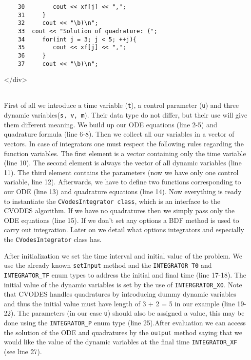 \documentclass[a4paper,12pt]{book}
\newcommand{\codeend}{
\begin{rawhtml}
</div>
\end{rawhtml}
}
\begin{document}
{\begin{verbatim}
    30        cout << xf[j] << ",";
    31     }
    32     cout << "\b)\n";
    33  cout << "Solution of quadrature: (";
    34     for(int j = 3; j < 5; ++j){
    35        cout << xf[j] << ",";
    36     }
    37     cout << "\b)\n";
\end{verbatim}
\codeend\\
First of all we introduce a time variable (\texttt{t}), a control parameter (\texttt{u}) and three dynamic variables(\texttt{s, v, m}).
Their data type do not differ, but their use will give them different meaning. We build up our ODE equations (line 2-5) and quadrature formula
(line 6-8). Then we collect all our variables in a vector of vectors. In case of integrators one must respect the following rules regarding the
function variables. The first element
is a vector containing only the time variable (line 10). The second element is always the vector of all dynamic variables (line 11).
The third element contains the parameters (now we have only one control variable, line 12). Afterwards, we have to define two functions corresponding
to our ODE (line 13) and quadrature equations (line 14). Now everything is ready to instantiate the \texttt{CVodesIntegrator class}, which is an interface
to the CVODES algorithm. If we have no quadratures then we simply pass only the ODE equations (line 15). If we don't set any options a BDF method is used
to carry out integration. Later on we detail what options integrators and especially the \texttt{CVodesIntegrator} class has.
\par After initialization we set the time interval and initial value of the problem. We use the already known \texttt{setInput} method and the
\texttt{INTEGRATOR\_T0} and \texttt{INTEGRATOR\_TF} enum types to address the initial and final time (line 17-18). The initial value of the dynamic
variables is set by the use of \texttt{INTERGRATOR\_X0}. Note that CVODES handles quadratures by introducing dummy dynamic variables and thus the initial
value must have length of 3 + 2 = 5 in our example (line 19-22). The parameters (in our case \texttt{u}) should also be assigned a value, this may be done
using the \texttt{INTEGRATOR\_P} enum type (line 25).After evaluation we can access the solution of the ODE and quadratures by the \texttt{output} method
saying that we would like the value of the dynamic variables at the final time \texttt{INTEGRATOR\_XF} (see line 27).
}
\end{document}
